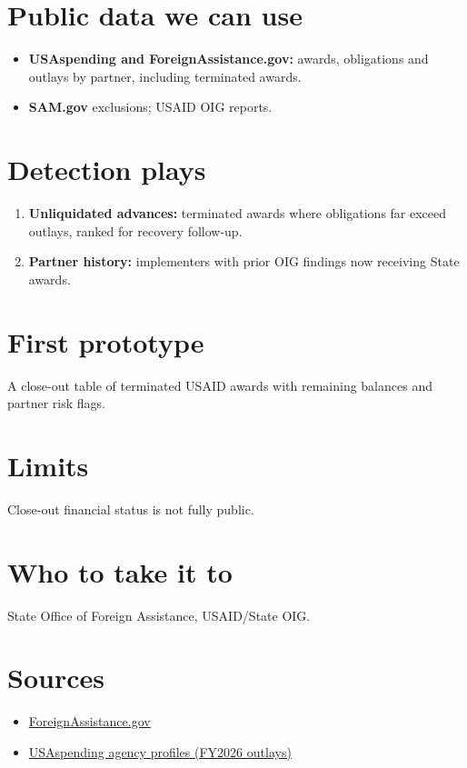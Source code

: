 \documentclass[letterpaper,11pt]{article}
\providecommand{\tightlist}{\setlength{\itemsep}{0pt}\setlength{\parskip}{0pt}}
\begin{document}
\hypertarget{public-data-we-can-use}{%
\section{Public data we can use}\label{public-data-we-can-use}}

\begin{itemize}
\tightlist
\item
  \textbf{USAspending and ForeignAssistance.gov:} awards, obligations
  and outlays by partner, including terminated awards.
\item
  \textbf{SAM.gov} exclusions; USAID OIG reports.
\end{itemize}

\hypertarget{detection-plays}{%
\section{Detection plays}\label{detection-plays}}

\begin{enumerate}
\def\labelenumi{\arabic{enumi}.}
\tightlist
\item
  \textbf{Unliquidated advances:} terminated awards where obligations
  far exceed outlays, ranked for recovery follow-up.
\item
  \textbf{Partner history:} implementers with prior OIG findings now
  receiving State awards.
\end{enumerate}

\hypertarget{first-prototype}{%
\section{First prototype}\label{first-prototype}}

A close-out table of terminated USAID awards with remaining balances and
partner risk flags.

\hypertarget{limits}{%
\section{Limits}\label{limits}}

Close-out financial status is not fully public.

\hypertarget{who-to-take-it-to}{%
\section{Who to take it to}\label{who-to-take-it-to}}

State Office of Foreign Assistance, USAID/State OIG.

\hypertarget{sources}{%
\section{Sources}\label{sources}}

\begin{itemize}
\tightlist
\item
  \href{https://foreignassistance.gov/}{ForeignAssistance.gov}
\item
  \href{https://www.usaspending.gov/agency}{USAspending agency profiles
  (FY2026 outlays)}
\end{itemize}
\end{document}
